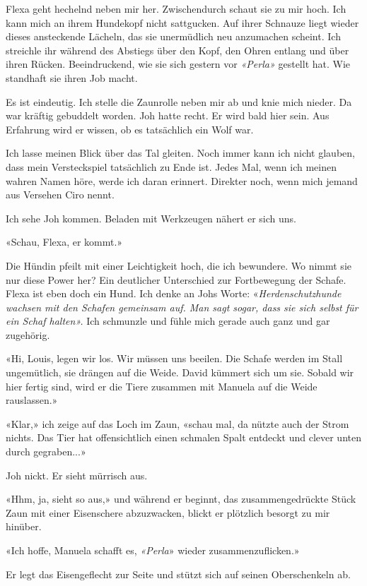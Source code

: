 Flexa geht hechelnd neben mir her. Zwischendurch schaut sie zu mir hoch.
Ich kann mich an ihrem Hundekopf nicht sattgucken. Auf ihrer Schnauze
liegt wieder dieses ansteckende Lächeln, das sie unermüdlich neu
anzumachen scheint. Ich streichle ihr während des Abstiegs über den
Kopf, den Ohren entlang und über ihren Rücken. Beeindruckend, wie sie
sich gestern vor \emph{«Perla»} gestellt hat. Wie standhaft sie ihren
Job macht.

Es ist eindeutig. Ich stelle die Zaunrolle neben mir ab und knie mich
nieder. Da war kräftig gebuddelt worden. Joh hatte recht. Er wird bald
hier sein. Aus Erfahrung wird er wissen, ob es tatsächlich ein Wolf war.

Ich lasse meinen Blick über das Tal gleiten. Noch immer kann ich nicht
glauben, dass mein Versteckspiel tatsächlich zu Ende ist. Jedes Mal,
wenn ich meinen wahren Namen höre, werde ich daran erinnert. Direkter
noch, wenn mich jemand aus Versehen Ciro nennt.

Ich sehe Joh kommen. Beladen mit Werkzeugen nähert er sich uns.

«Schau, Flexa, er kommt.»

Die Hündin pfeilt mit einer Leichtigkeit hoch, die ich bewundere. Wo
nimmt sie nur diese Power her? Ein deutlicher Unterschied zur
Fortbewegung der Schafe. Flexa ist eben doch ein Hund. Ich denke an Johs
Worte: «\emph{Herdenschutzhunde wachsen mit den Schafen gemeinsam auf.
Man sagt sogar, dass sie sich selbst für ein Schaf halten».} Ich
schmunzle und fühle mich gerade auch ganz und gar zugehörig.

«Hi, Louis, legen wir los. Wir müssen uns beeilen. Die Schafe werden im
Stall ungemütlich, sie drängen auf die Weide. David kümmert sich um sie.
Sobald wir hier fertig sind, wird er die Tiere zusammen mit Manuela auf
die Weide rauslassen.»

«Klar,» ich zeige auf das Loch im Zaun, «schau mal, da nützte auch der
Strom nichts. Das Tier hat offensichtlich einen schmalen Spalt entdeckt
und clever unten durch gegraben...»

Joh nickt. Er sieht mürrisch aus.

«Hhm, ja, sieht so aus,» und während er beginnt, das zusammengedrückte
Stück Zaun mit einer Eisenschere abzuzwacken, blickt er plötzlich
besorgt zu mir hinüber.

«Ich hoffe, Manuela schafft es, \emph{«Perla}» wieder
zusammenzuflicken.»

Er legt das Eisengeflecht zur Seite und stützt sich auf seinen
Oberschenkeln ab.

